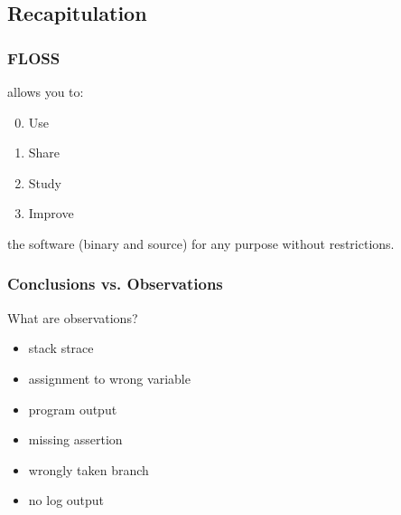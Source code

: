 \subsection{Recapitulation}

\begin{frame}
	\frametitle{FLOSS}

	\floss{} allows you to:
	\pause
	\vspace{1em}
	\begin{enumerate}
		\setcounter{enumi}{-1}
		\item Use
		\item Share
		\item Study
		\item Improve
	\end{enumerate}
	\vspace{1em}
	the software (binary and source) for any purpose without restrictions.
\end{frame}





\breakframe



\begin{frame}
	\frametitle{Conclusions vs. Observations}

	What are observations?

	\begin{itemize}[<+-| alert@+>]
		\item stack strace
		\item assignment to wrong variable
		\item program output
		\item missing assertion
		\item wrongly taken branch
		\item no log output
	\end{itemize}
\end{frame}

